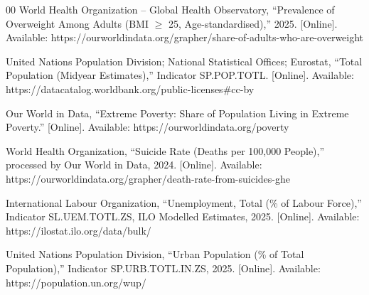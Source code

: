 \documentclass[conference]{IEEEtran}
\begin{document}
\begin{thebibliography}{00}
 World Health Organization -- Global Health Observatory, ``Prevalence of Overweight Among Adults (BMI $\geq$ 25, Age-standardised),'' 2025. [Online]. Available: https://ourworldindata.org/grapher/share-of-adults-who-are-overweight

 United Nations Population Division; National Statistical Offices; Eurostat, ``Total Population (Midyear Estimates),'' Indicator SP.POP.TOTL. [Online]. Available: https://datacatalog.worldbank.org/public-licenses\#cc-by

 Our World in Data, ``Extreme Poverty: Share of Population Living in Extreme Poverty.'' [Online]. Available: https://ourworldindata.org/poverty

 World Health Organization, ``Suicide Rate (Deaths per 100{,}000 People),'' processed by Our World in Data, 2024. [Online]. Available: https://ourworldindata.org/grapher/death-rate-from-suicides-ghe

 International Labour Organization, ``Unemployment, Total (\% of Labour Force),'' Indicator SL.UEM.TOTL.ZS, ILO Modelled Estimates, 2025. [Online]. Available: https://ilostat.ilo.org/data/bulk/

 United Nations Population Division, ``Urban Population (\% of Total Population),'' Indicator SP.URB.TOTL.IN.ZS, 2025. [Online]. Available: https://population.un.org/wup/

\end{thebibliography}
\end{document}
